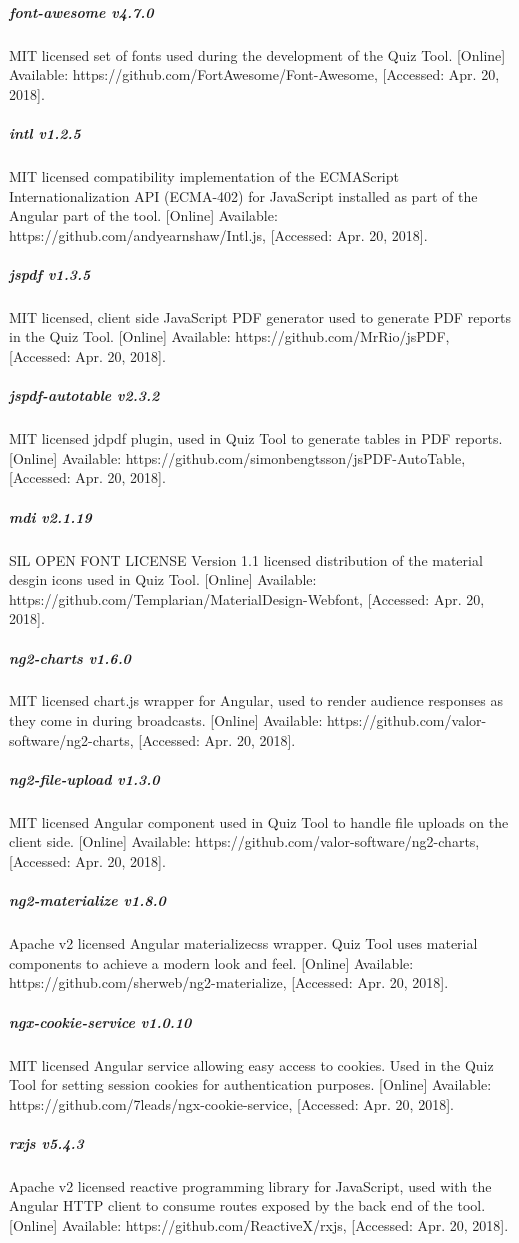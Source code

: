 \subparagraph{font-awesome v4.7.0}
MIT licensed set of fonts used during the development of the Quiz Tool.
[Online] Available: https://github.com/FortAwesome/Font-Awesome, [Accessed: Apr. 20, 2018].

\subparagraph{intl v1.2.5}
MIT licensed compatibility implementation of the ECMAScript Internationalization API (ECMA-402) for JavaScript
installed as part of the Angular part of the tool. [Online] Available: https://github.com/andyearnshaw/Intl.js, [Accessed: Apr. 20, 2018].

\subparagraph{jspdf v1.3.5}
MIT licensed, client side JavaScript PDF generator used to generate PDF reports in the Quiz Tool.
[Online] Available: https://github.com/MrRio/jsPDF, [Accessed: Apr. 20, 2018].

\subparagraph{jspdf-autotable v2.3.2}
MIT licensed jdpdf plugin, used in Quiz Tool to generate tables in PDF reports.
[Online] Available: https://github.com/simonbengtsson/jsPDF-AutoTable, [Accessed: Apr. 20, 2018].

\subparagraph{mdi v2.1.19}
SIL OPEN FONT LICENSE Version 1.1 licensed distribution of the material desgin icons used in Quiz Tool.
[Online] Available: https://github.com/Templarian/MaterialDesign-Webfont, [Accessed: Apr. 20, 2018].

\subparagraph{ng2-charts v1.6.0}
MIT licensed chart.js wrapper for Angular, used to render audience responses as they come in during
broadcasts. [Online] Available: https://github.com/valor-software/ng2-charts, [Accessed: Apr. 20, 2018].

\subparagraph{ng2-file-upload v1.3.0}
MIT licensed Angular component used in Quiz Tool to handle file uploads on the client side.
[Online] Available: https://github.com/valor-software/ng2-charts, [Accessed: Apr. 20, 2018].

\subparagraph{ng2-materialize v1.8.0}
Apache v2 licensed Angular materializecss wrapper. Quiz Tool uses material components to achieve
a modern look and feel.
[Online] Available: https://github.com/sherweb/ng2-materialize, [Accessed: Apr. 20, 2018].

\subparagraph{ngx-cookie-service v1.0.10}
MIT licensed Angular service allowing easy access to cookies. Used in the Quiz Tool for
setting session cookies for authentication purposes.
[Online] Available: https://github.com/7leads/ngx-cookie-service, [Accessed: Apr. 20, 2018].

\subparagraph{rxjs v5.4.3}
Apache v2 licensed reactive programming library for JavaScript, used with the Angular HTTP
client to consume routes exposed by the back end of the tool.
[Online] Available: https://github.com/ReactiveX/rxjs, [Accessed: Apr. 20, 2018].

